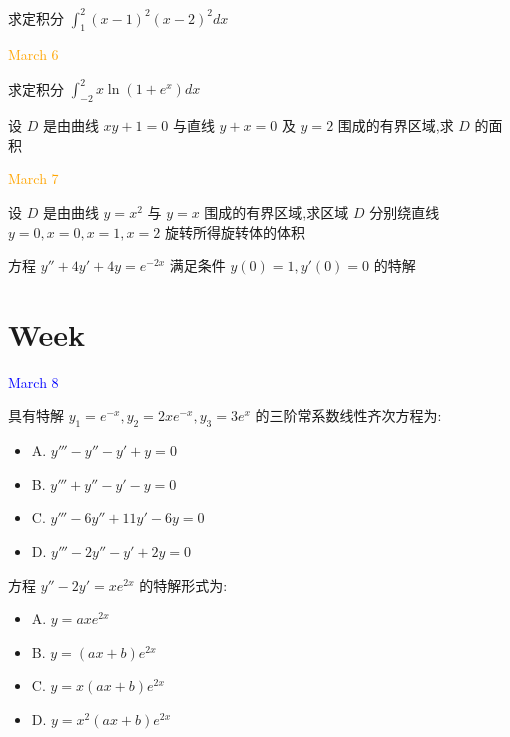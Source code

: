 \begin{example}[][Exam: 29.1.10]
	求定积分 $\int_{1}^{2}(x-1)^{2}(x-2)^{2}dx$
\end{example}

\textcolor{orange}{March 6}

\begin{example}[][Exam: 29.1.11]
	求定积分 $\int_{-2}^{2}x\ln(1+e^{x})dx$
\end{example}

\begin{example}[][Exam: 29.1.12]
	设 $D$ 是由曲线 $xy+1=0$ 与直线 $y+x=0$ 及 $y=2$ 围成的有界区域,求 $D$ 的面积
\end{example}

\textcolor{orange}{March 7}

\begin{example}[][Exam: 29.1.13]
	设 $D$ 是由曲线 $y=x^{2}$ 与 $y=x$ 围成的有界区域,求区域 $D$ 分别绕直线 $y=0,x=0,x=1,x=2$ 旋转所得旋转体的体积
\end{example}

\begin{example}[][Exam: 29.1.14]
	方程 $y''+4y'+4y=e^{-2x}$ 满足条件 $y(0)=1,y'(0)=0$ 的特解
\end{example}

\section{Week }
\textcolor{blue}{March 8}

\begin{example}[][Exam: 29.2.1]
	具有特解 $y_{1}=e^{-x},y_{2}=2xe^{-x},y_{3}=3e^{x}$ 的三阶常系数线性齐次方程为:
\begin{itemize}
	\item A. $y'''-y''-y'+y=0$
	\item B. $y'''+y''-y'-y=0$
	\item C. $y'''-6y''+11y'-6y=0$
	\item D. $y'''-2y''-y'+2y=0$
\end{itemize}
\end{example}

\begin{example}[][Exam: 29.2.2]
	方程 $y''-2y'=xe^{2x}$ 的特解形式为:
\begin{itemize}
	\item A. $y=axe^{2x}$
	\item B. $y=(ax+b)e^{2x}$
	\item C. $y=x(ax+b)e^{2x}$
	\item D. $y=x^{2}(ax+b)e^{2x}$
\end{itemize}
\end{example}

